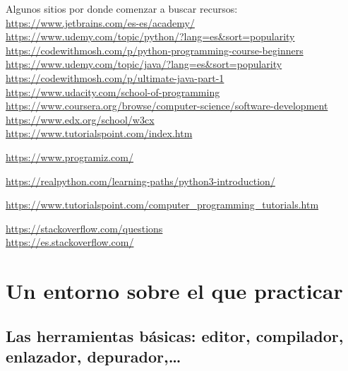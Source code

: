 \documentclass[spanish,12pt,a4paper,final,oneside]{book}
\begin{document}
Algunos sitios por donde comenzar a buscar recursos:
\\ \url{https://www.jetbrains.com/es-es/academy/}
\\ \url{https://www.udemy.com/topic/python/?lang=es&sort=popularity}
\\ \url{https://codewithmosh.com/p/python-programming-course-beginners}
\\ \url{https://www.udemy.com/topic/java/?lang=es&sort=popularity}
\\ \url{https://codewithmosh.com/p/ultimate-java-part-1}
\\ \url{https://www.udacity.com/school-of-programming}
\\ \url{https://www.coursera.org/browse/computer-science/software-development}
\\ \url{https://www.edx.org/school/w3cx}
\\ \url{https://www.tutorialspoint.com/index.htm}

\url{https://www.programiz.com/}

\url{https://realpython.com/learning-paths/python3-introduction/}

\url{https://www.tutorialspoint.com/computer_programming_tutorials.htm}

\url{https://stackoverflow.com/questions}
\\ \url{https://es.stackoverflow.com/}






\chapter{Un entorno sobre el que practicar}



\section{Las herramientas básicas: editor, compilador,  enlazador, depurador,\ldots}
\end{document}

